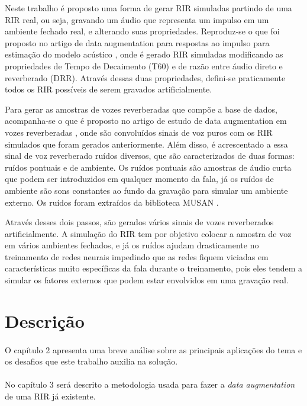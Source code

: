 Neste trabalho é proposto uma forma de gerar RIR simuladas partindo de uma RIR real, ou seja, gravando um áudio que representa um impulso em um ambiente
fechado real, e alterando suas propriedades. Reproduz-se o que foi proposto no artigo de data augmentation para respostas ao impulso para
estimação do modelo acústico \cite{RIR_Data_Aug}, onde é gerado RIR simuladas modificando as propriedades de Tempo de Decaimento (T60) e de
razão entre áudio direto e reverberado (DRR). Através dessas duas propriedades, defini-se praticamente todos os RIR possíveis de serem gravados
artificialmente.

Para gerar as amostras de vozes reverberadas que compõe a base de dados, acompanha-se o que é proposto no artigo de estudo de data
augmentation em vozes reverberadas \cite{Speech_Rec}, onde são convoluídos sinais de voz puros com os RIR simulados que foram gerados anteriormente.
Além disso, é acrescentado a essa sinal de voz reverberado ruídos diversos, que são caracterizados de duas formas: ruídos pontuais e de ambiente.
Os ruídos pontuais são amostras de áudio curta que podem ser introduzidos em qualquer momento da fala, já os ruídos de ambiente são sons constantes
ao fundo da gravação para simular um ambiente externo. Os ruídos foram extraídos da biblioteca MUSAN \cite{noiseLib}.

Através desses dois passos, são gerados vários sinais de vozes reverberados artificialmente. A simulação do RIR tem por objetivo colocar
a amostra de voz em vários ambientes fechados, e já os ruídos ajudam drasticamente no treinamento de redes neurais impedindo que as redes fiquem
viciadas em características muito específicas da fala durante o treinamento, pois eles tendem a simular os fatores externos que podem estar envolvidos em uma
gravação real.


\section{Descrição}

\paragraph{}O capítulo 2 apresenta uma breve análise sobre as principais aplicações do tema e os desafios que este trabalho auxilia na solução.

\paragraph{}No capítulo 3 será descrito a metodologia usada para fazer a \textit{data augmentation} de uma RIR já existente.

